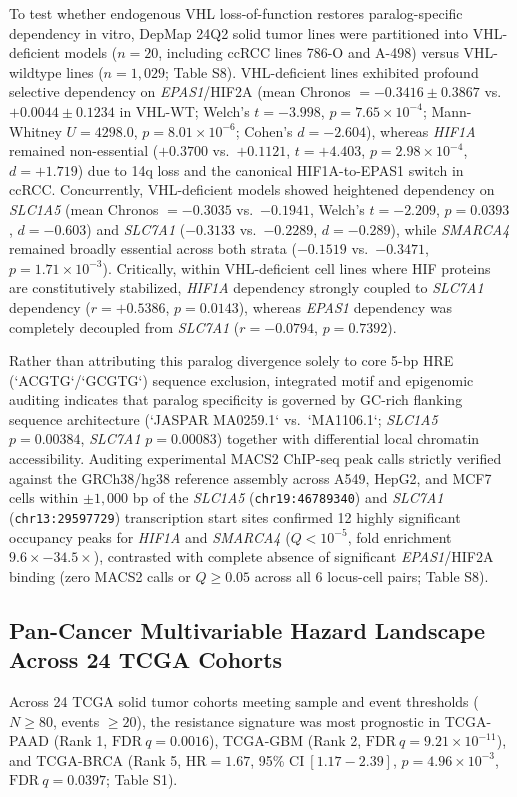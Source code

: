 \documentclass[11pt,a4paper]{article}
\begin{document}
To test whether endogenous VHL loss-of-function restores paralog-specific dependency in vitro, DepMap 24Q2 solid tumor lines were partitioned into VHL-deficient models ($n = 20$, including ccRCC lines 786-O and A-498) versus VHL-wildtype lines ($n = 1,029$; Table S8). VHL-deficient lines exhibited profound selective dependency on \textit{EPAS1}/HIF2A (mean Chronos $= -0.3416 \pm 0.3867$ vs.\ $+0.0044 \pm 0.1234$ in VHL-WT; Welch's $t = -3.998$, $p = 7.65 \times 10^{-4}$; Mann-Whitney $U = 4298.0$, $p = 8.01 \times 10^{-6}$; Cohen's $d = -2.604$), whereas \textit{HIF1A} remained non-essential ($+0.3700$ vs.\ $+0.1121$, $t = +4.403$, $p = 2.98 \times 10^{-4}$, $d = +1.719$) due to 14q loss and the canonical HIF1A-to-EPAS1 switch in ccRCC. Concurrently, VHL-deficient models showed heightened dependency on \textit{SLC1A5} (mean Chronos $= -0.3035$ vs.\ $-0.1941$, Welch's $t = -2.209$, $p = 0.0393$, $d = -0.603$) and \textit{SLC7A1} ($-0.3133$ vs.\ $-0.2289$, $d = -0.289$), while \textit{SMARCA4} remained broadly essential across both strata ($-0.1519$ vs.\ $-0.3471$, $p = 1.71 \times 10^{-3}$). Critically, within VHL-deficient cell lines where HIF proteins are constitutively stabilized, \textit{HIF1A} dependency strongly coupled to \textit{SLC7A1} dependency ($r = +0.5386$, $p = 0.0143$), whereas \textit{EPAS1} dependency was completely decoupled from \textit{SLC7A1} ($r = -0.0794$, $p = 0.7392$).

Rather than attributing this paralog divergence solely to core 5-bp HRE (`ACGTG`/`GCGTG`) sequence exclusion, integrated motif and epigenomic auditing indicates that paralog specificity is governed by GC-rich flanking sequence architecture (`JASPAR MA0259.1` vs.\ `MA1106.1`; \textit{SLC1A5} $p = 0.00384$, \textit{SLC7A1} $p = 0.00083$) together with differential local chromatin accessibility. Auditing experimental MACS2 ChIP-seq peak calls strictly verified against the GRCh38/hg38 reference assembly across A549, HepG2, and MCF7 cells within $\pm 1,000$ bp of the \textit{SLC1A5} (\texttt{chr19:46789340}) and \textit{SLC7A1} (\texttt{chr13:29597729}) transcription start sites confirmed 12 highly significant occupancy peaks for \textit{HIF1A} and \textit{SMARCA4} ($Q < 10^{-5}$, fold enrichment $9.6\times - 34.5\times$), contrasted with complete absence of significant \textit{EPAS1}/HIF2A binding (zero MACS2 calls or $Q \ge 0.05$ across all 6 locus-cell pairs; Table S8).

\subsection{Pan-Cancer Multivariable Hazard Landscape Across 24 TCGA Cohorts}
Across 24 TCGA solid tumor cohorts meeting sample and event thresholds ($N \ge 80$, events $\ge 20$), the resistance signature was most prognostic in TCGA-PAAD (Rank 1, $\text{FDR}~q = 0.0016$), TCGA-GBM (Rank 2, $\text{FDR}~q = 9.21 \times 10^{-11}$), and TCGA-BRCA (Rank 5, $\text{HR} = 1.67$, 95\% $\text{CI}~[1.17 - 2.39]$, $p = 4.96 \times 10^{-3}$, $\text{FDR}~q = 0.0397$; Table S1).
\end{document}
